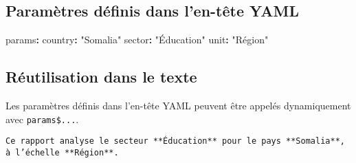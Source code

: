 \documentclass[
  letterpaper,
  DIV=11,
  numbers=noendperiod]{scrartcl}
\newenvironment{Shaded}{\begin{snugshade}}{\end{snugshade}}
\newcommand{\AttributeTok}[1]{\textcolor[rgb]{0.40,0.45,0.13}{#1}}
\newcommand{\FunctionTok}[1]{\textcolor[rgb]{0.28,0.35,0.67}{#1}}
\newcommand{\KeywordTok}[1]{\textcolor[rgb]{0.00,0.23,0.31}{\textbf{#1}}}
\newcommand{\NormalTok}[1]{\textcolor[rgb]{0.00,0.23,0.31}{#1}}
\newcommand{\StringTok}[1]{\textcolor[rgb]{0.13,0.47,0.30}{#1}}
\begin{document}
\subsection{Paramètres définis dans l'en-tête
YAML}\label{paramuxe8tres-duxe9finis-dans-len-tuxeate-yaml}

\begin{Shaded}
\begin{Highlighting}[]
\FunctionTok{params}\KeywordTok{:}
\AttributeTok{  }\FunctionTok{country}\KeywordTok{:}\AttributeTok{ }\StringTok{"Somalia"}
\AttributeTok{  }\FunctionTok{sector}\KeywordTok{:}\AttributeTok{ }\StringTok{"Éducation"}
\AttributeTok{  }\FunctionTok{unit}\KeywordTok{:}\AttributeTok{ }\StringTok{"Région"}
\end{Highlighting}
\end{Shaded}

\subsection{Réutilisation dans le
texte}\label{ruxe9utilisation-dans-le-texte}

Les paramètres définis dans l'en-tête YAML peuvent être appelés
dynamiquement avec \texttt{params\$...}.

\begin{Shaded}
\end{Shaded}

\begin{verbatim}
Ce rapport analyse le secteur **Éducation** pour le pays **Somalia**, à l’échelle **Région**.
\end{verbatim}
\end{document}
